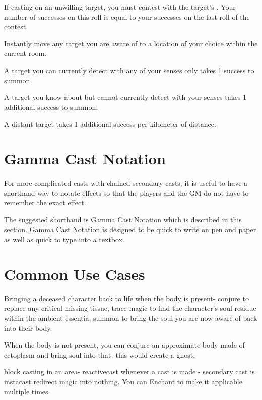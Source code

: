 \begin{GRPtablewide}
{		If casting on an unwilling target, you must contest with the target's . Your number of successes on this roll is equal to your successes on the last roll of the contest.
	}

	{%
		Instantly move any target you are aware of to a location of your choice within the current room.

		A target you can currently detect with any of your senses only takes 1 success to summon.

		A target you know about but cannot currently detect with your senses takes 1 additional success to summon.

		A distant target takes 1 additional success per kilometer of distance.
	}
\end{GRPtablewide}

\section{Gamma Cast Notation}

For more complicated casts with chained secondary casts, it is useful to have a shorthand way to notate effects so that the players and the GM do not have to remember the exact effect.

The suggested shorthand is Gamma Cast Notation which is described in this section. Gamma Cast Notation is designed to be quick to write on pen and paper as well as quick to type into a textbox.



\section{Common Use Cases}

Bringing a deceased character back to life when the body is present-  conjure to replace any critical missing tissue, trace magic to find the character's soul residue within the ambient essentia, summon to bring the soul you are now aware of back into their body.

When the body is not present, you can conjure an approximate body made of ectoplasm and bring soul into that- this would create a ghost.

block casting in an area- reactivecast whenever a cast is made - secondary cast is instacast redirect magic into nothing.  You can Enchant to make it applicable multiple times.




